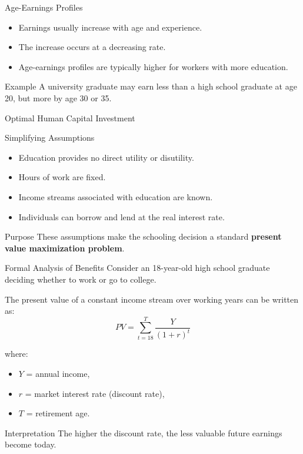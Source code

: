 \documentclass[aspectratio=169]{beamer}
\begin{document}
\begin{frame}{Age-Earnings Profiles}
\transfade
\begin{itemize}[<+->]
  \item Earnings usually increase with age and experience.
  \item The increase occurs at a decreasing rate.
  \item Age-earnings profiles are typically higher for workers with more education.
\end{itemize}

\begin{exampleblock}{Example}
A university graduate may earn less than a high school graduate at age 20, but more by age 30 or 35.
\end{exampleblock}
\end{frame}

\begin{frame}{Optimal Human Capital Investment}
\transfade
\begin{block}{Simplifying Assumptions}
\begin{itemize}[<+->]
  \item Education provides no direct utility or disutility.
  \item Hours of work are fixed.
  \item Income streams associated with education are known.
  \item Individuals can borrow and lend at the real interest rate.
\end{itemize}
\end{block}

\begin{block}{Purpose}
These assumptions make the schooling decision a standard \textbf{present value maximization problem}.
\end{block}
\end{frame}

\begin{frame}{Formal Analysis of Benefits}
\transfade
Consider an 18-year-old high school graduate deciding whether to work or go to college.

The present value of a constant income stream over working years can be written as:
\[
PV = \sum_{t=18}^{T} \frac{Y}{(1+r)^t}
\]

where:
\begin{itemize}[<+->]
  \item \(Y\) = annual income,
  \item \(r\) = market interest rate (discount rate),
  \item \(T\) = retirement age.
\end{itemize}

\begin{block}{Interpretation}
The higher the discount rate, the less valuable future earnings become today.
\end{block}
\end{frame}
\end{document}
